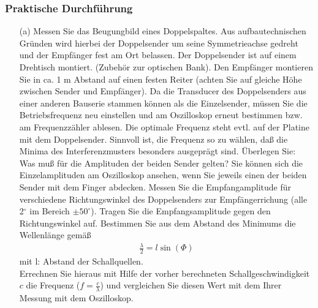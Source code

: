 \documentclass[12pt]{scrartcl}
\begin{document}
\subsubsection{Praktische Durchführung}
\begin{itemize}
\item[(a)]
Messen Sie das Beugungbild eines Doppelspaltes. Aus aufbautechnischen Gründen wird hierbei der Doppelsender um seine Symmetrieachse gedreht und der Empfänger fest am Ort belassen. Der Doppelsender ist auf einem Drehtisch montiert. (Zubehör zur optischen Bank). Den Empfänger montieren Sie
in ca. 1 m Abstand auf einen festen Reiter (achten Sie auf gleiche Höhe zwischen Sender und Empfänger). Da die Transducer des Doppelsenders aus einer anderen Bauserie stammen können als die Einzelsender, müssen Sie die Betriebsfrequenz neu einstellen und am Oszilloskop erneut bestimmen bzw. am Frequenzzähler ablesen. Die optimale Frequenz steht evtl. auf der Platine mit dem Doppelsender. Sinnvoll ist, die Frequenz so zu wählen, daß die Minima des Interferenzmusters
besonders ausgeprägt sind. Überlegen Sie: Was muß für die Amplituden der beiden Sender gelten? Sie können sich die Einzelamplituden am Oszilloskop ansehen, wenn Sie jeweils einen der beiden Sender mit dem Finger abdecken.
Messen Sie die Empfangamplitude für verschiedene Richtungswinkel des Doppelsenders zur Empfängerrichung (alle 2$^{\circ}$ im Bereich $\pm 50^{\circ}$). Tragen Sie die Empfangsamplitude gegen den Richtungswinkel auf. Bestimmen Sie aus dem Abstand des Minimums die Wellenlänge gemäß
\begin{align}
\frac{\lambda}{2} = l\sin(\Phi)
\end{align}
mit l: Abstand der Schallquellen.\\
Errechnen Sie hieraus mit Hilfe der vorher berechneten Schallgeschwindigkeit $c$ die Frequenz ($f = \frac{c}{\lambda}$) und vergleichen Sie diesen Wert mit dem Ihrer Messung mit dem Oszilloskop.
\end{itemize}
\end{document}
